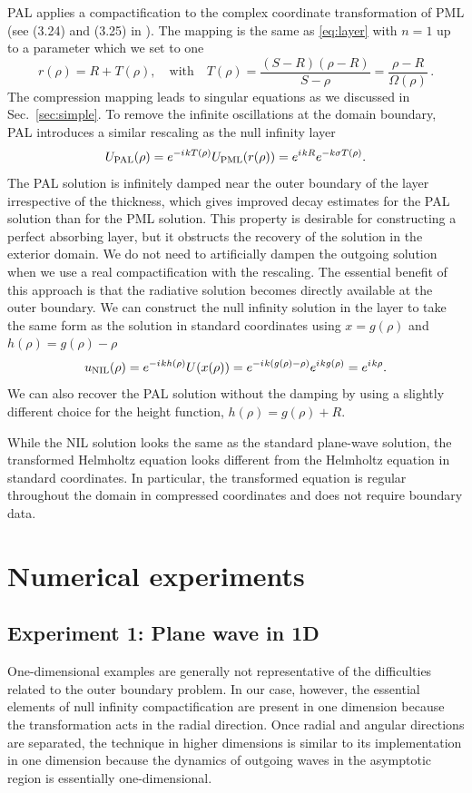 \documentclass[draft,onefignum,onetabnum]{siamart190516}
\newcommand{\iu}{{i\mkern1mu}}
\begin{document}
PAL applies a compactification to the complex coordinate transformation of PML (see (3.24) and (3.25) in \cite{yang2021truly}). The mapping is the same as \eqref{eq:layer} with $n=1$ up to a parameter which we set to one 
\[ r(\rho) = R + T(\rho), \quad \mathrm{with} \quad T(\rho) = \frac{(S-R)(\rho-R)}{S-\rho} = \frac{\rho-R}{\Omega(\rho)}\,. \]
The compression mapping leads to singular equations as we discussed in Sec.~\ref{sec:simple}. To remove the infinite oscillations at the domain boundary, PAL introduces a similar rescaling as the null infinity layer
\[ U_{\mathrm{PAL}}(\rho) = e^{-\iu k T(\rho)} U_{\mathrm{PML}}(r(\rho)) = e^{\iu k R} e^{-k \sigma T(\rho)}. \]
The PAL solution is infinitely damped near the outer boundary of the layer irrespective of the thickness, which gives improved decay estimates for the PAL solution than for the PML solution. This property is desirable for constructing a perfect absorbing layer, but it obstructs the recovery of the solution in the exterior domain. We do not need to artificially dampen the outgoing solution when we use a real compactification with the rescaling. The essential benefit of this approach is that the radiative solution becomes directly available at the outer boundary. We can construct the null infinity solution in the layer to take the same form as the solution in standard coordinates using $x=g(\rho)$ and $h(\rho) = g(\rho) - \rho$
\[ u_{\mathrm{NIL}}(\rho) = e^{-\iu k h(\rho)} U(x(\rho)) = e^{-\iu k (g(\rho)-\rho)} e^{\iu k g(\rho)} = e^{\iu k \rho}. \]
We can also recover the PAL solution without the damping by using a slightly different choice for the height function,  $h(\rho) = g(\rho) + R$.  

While the NIL solution looks the same as the standard plane-wave solution, the transformed Helmholtz equation looks different from the Helmholtz equation in standard coordinates. In particular, the transformed equation is regular throughout the domain in compressed coordinates and does not require boundary data. 

\section{Numerical experiments}\label{sec:numerical}

\subsection{Experiment 1: Plane wave in 1D}\label{sec:oned}
One-dimensional examples are generally not representative of the difficulties related to the outer boundary problem. In our case, however, the essential elements of null infinity compactification are present in one dimension because the transformation acts in the radial direction. Once radial and angular directions are separated, the technique in higher dimensions is similar to its implementation in one dimension because the dynamics of outgoing waves in the asymptotic region is essentially one-dimensional.
\end{document}
